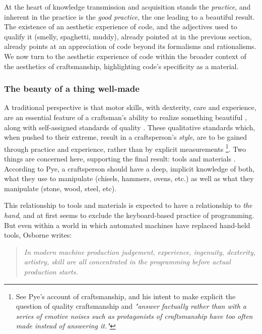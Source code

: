 At the heart of knowledge transmission and acquisition stands the \emph{practice}, and inherent in the practice is the \emph{good practice}, the one leading to a beautiful result. The existence of an aesthetic experience of code, and the adjectives used to qualify it (smelly, spaghetti, muddy), already pointed at in the previous section, already points at an appreciation of code beyond its formalisms and rationalisms. We now turn to the aesthetic experience of code within the broader context of the aesthetics of craftsmanship, highlighting code's specificity as a material.

\subsubsection{The beauty of a thing well-made}

A traditional perspective is that motor skills, with dexterity, care and experience, are an essential feature of a craftsman's ability to realize something beautiful \citep{osborne_aesthetic_1977}, along with self-assigned standards of quality \citep{pye_nature_2008,sennett_craftsman_2009}. These qualitative standards which, when pushed to their extreme, result in a craftsperson's \emph{style}, are to be gained through practice and experience, rather than by explicit measurements \citep{pye_nature_2008} \footnote{See Pye's account of craftsmanship, and his intent to make explicit the question of quality craftsmanship and \emph{"answer factually rather than with a series of emotive noises such as protagonists of craftsmanship have too often made instead of answering it."}}. Two things are concerned here, supporting the final result: tools and materials \citep{pye_nature_2008}. According to Pye, a craftsperson should have a deep, implicit knowledge of both, what they use to manipulate (chisels, hammers, ovens, etc.) as well as what they manipulate (stone, wood, steel, etc).

This relationship to tools and materials is expected to have a relationship to \emph{the hand}, and at first seems to exclude the keyboard-based practice of programming. But even within a world in which automated machines have replaced hand-held tools, Osborne writes:

\begin{quote}
  \textit{In modern machine production judgement, experience, ingenuity, dexterity, artistry, skill are all concentrated in the programming before actual production starts. \citep{osborne_aesthetic_1977}}
\end{quote}

